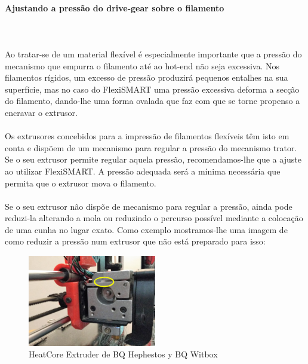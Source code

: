 \documentclass[11pt,a4paper]{article}
\begin{document}
	\paragraph{Ajustando a pressão do drive-gear sobre o filamento}\mbox{}\\\\
Ao tratar-se de um material flexível é especialmente importante que a pressão do mecanismo que empurra o filamento até ao hot-end não seja excessiva. Nos filamentos rígidos, um excesso de pressão produzirá pequenos entalhes na sua superfície, mas no caso do FlexiSMART uma pressão excessiva deforma a secção do filamento, dando-lhe uma forma ovalada que faz com que se torne propenso a encravar o extrusor.
\\\\
Os extrusores concebidos para a impressão de filamentos flexíveis têm isto em conta e dispõem de um mecanismo para regular a pressão do mecanismo trator. Se o seu extrusor permite regular aquela pressão, recomendamos-lhe que a ajuste ao utilizar FlexiSMART. A pressão adequada será a mínima necessária que permita que o extrusor mova o filamento.
\\\\
Se o seu extrusor não dispõe de mecanismo para regular a pressão, ainda pode reduzi-la alterando a mola ou reduzindo o percurso possível mediante a colocação de uma cunha no lugar exato. Como exemplo mostramos-lhe uma imagem de como reduzir a pressão num extrusor que não está preparado para isso:
\begin{figure}[H]
\centering
\includegraphics[width=0.5\textwidth,cfbox=azul_marcos 4pt 0pt]{FOTOS/SOLUCION1}
\caption*{HeatCore Extruder de BQ Hephestos y BQ Witbox}
\end{figure}
\end{document}
